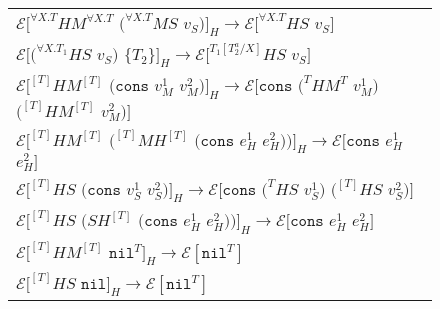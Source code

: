 \begin{figure}[p]
\begin{tabular}{l}
\vspace{5pt}

$\mathscr{E}[^{\forall X.T}HM^{\forall X.T}$ $(^{\forall X.T}MS$ $v_{S})]_{H}\rightarrow\mathscr{E}[^{\forall X.T}HS$ $v_{S}]$ \\

\vspace{5pt}

$\mathscr{E}[(^{\forall X.T_{1}}HS$ $v_{S})$ $\lbrace T_{2}\rbrace]_{H}\rightarrow\mathscr{E}[^{T_{1}[T^{a}_{2}/X]}HS$ $v_{S}]$ \\

\vspace{5pt}

$\mathscr{E}[^{[T]}HM^{[T]}$ $(\mathtt{cons}$ $v_{M}^{1}$ $v_{M}^{2})]_{H}\rightarrow\mathscr{E}[\mathtt{cons}$ $(^{T}HM^{T}$ $v_{M}^{1})$ $(^{[T]}HM^{[T]}$ $v_{M}^{2})]$ \\

\vspace{5pt}

$\mathscr{E}[^{[T]}HM^{[T]}$ $(^{[T]}MH^{[T]}$ $(\mathtt{cons}$ $e_{H}^{1}$ $e_{H}^{2}))]_{H}\rightarrow\mathscr{E}[\mathtt{cons}$ $e_{H}^{1}$ $e_{H}^{2}]$ \\

\vspace{5pt}

$\mathscr{E}[^{[T]}HS$ $(\mathtt{cons}$ $v_{S}^{1}$ $v_{S}^{2})]_{H}\rightarrow\mathscr{E}[\mathtt{cons}$ $(^{T}HS$ $v_{S}^{1})$ $(^{[T]}HS$ $v_{S}^{2})]$ \\

\vspace{5pt}

$\mathscr{E}[^{[T]}HS$ $(SH^{[T]}$ $(\mathtt{cons}$ $e_{H}^{1}$ $e_{H}^{2}))]_{H}\rightarrow\mathscr{E}[\mathtt{cons}$ $e_{H}^{1}$ $e_{H}^{2}]$ \\

\vspace{5pt}

$\mathscr{E}[^{[T]}HM^{[T]}$ $\mathtt{nil}^{T}]_{H}\rightarrow\mathscr{E}[\mathtt{nil}^{T}]$ \\

\vspace{5pt}

$\mathscr{E}[^{[T]}HS$ $\mathtt{nil}]_{H}\rightarrow\mathscr{E}[\mathtt{nil}^{T}]$ \\


\end{tabular}
\end{figure}
